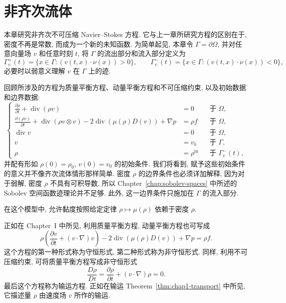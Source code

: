 \clearpage
\section{非齐次流体}
\label{chap:nonhomogeneous-fluids}
\renewcommand{\thestatement}{1.\arabic{statement}}
\renewcommand{\theHstatement}{ch06.sec01.\arabic{statement}}
\setcounter{statement}{0}
\renewcommand{\thechaptersixsectiononeremark}{1.\arabic{chaptersixsectiononeremark}}
\begin{sloppypar}

本章研究非齐次不可压缩 Navier--Stokes 方程. 它与上一章所研究方程的区别在于, 密度不再是常数, 而成为一个新的未知函数. 为简单起见, 本章令 $\Gamma=\partial\Omega$, 并对任意向量场 $v$ 和任意时刻 $t$, 将 $\Gamma$ 的流出部分和流入部分定义为
\[
 \Gamma_v^+(t)=\{x\in\Gamma:(v(t,x)\cdot\nu(x))>0\},
 \qquad
 \Gamma_v^-(t)=\{x\in\Gamma:(v(t,x)\cdot\nu(x))<0\},
\]
必要时以弱意义理解 $v$ 在 $\Gamma$ 上的迹.

回顾所涉及的方程为质量平衡方程、动量平衡方程和不可压缩约束, 以及初始数据和边界数据:
\[
\left\{
\begin{aligned}
 \frac{\partial\rho}{\partial t}+\operatorname{div}(\rho v)&=0&&\text{于 }\Omega,\\
 \frac{\partial(\rho v)}{\partial t}+\operatorname{div}(\rho v\otimes v)-2\operatorname{div}(\mu(\rho)D(v))+\nabla p&=\rho f&&\text{于 }\Omega,\\
 \operatorname{div}v&=0&&\text{于 }\Omega,\\
 v&=v_b&&\text{于 }\Gamma,\\
 \rho&=\rho^{\mathrm{in}}&&\text{于 }\Gamma_v^-(t),
\end{aligned}
\right.
\]
并配有形如 $\rho(0)=\rho_0$, $v(0)=v_0$ 的初始条件. 我们将看到, 赋予这些初始条件的意义并不像齐次流体情形那样简单. 密度 $\rho$ 的边界条件也必须详加解释, 因为对于弱解, 密度 $\rho$ 不具有可积导数, 所以 Chapter~\ref{chap:sobolev-spaces} 中所述的 Sobolev 空间函数迹理论并不足够. 此外, 这一边界条件只施加在 $\Gamma$ 的流入部分.

在这个模型中, 允许黏度按照给定定律 $\rho\mapsto\mu(\rho)$ 依赖于密度 $\rho$.

正如在 Chapter~I 中所见, 利用质量平衡方程, 动量平衡方程也可写成
\[
 \rho\left(\frac{\partial v}{\partial t}+(v\cdot\nabla)v\right)
 -2\operatorname{div}(\mu(\rho)D(v))+\nabla p=\rho f.
\]
这个方程的第一种形式称为守恒形式, 第二种形式称为非守恒形式. 同样, 利用不可压缩约束, 可将质量平衡方程写成非守恒形式
\begin{equation}
 \frac{D\rho}{Dt}=\frac{\partial\rho}{\partial t}+(v\cdot\nabla)\rho=0.
\label{eq:chap6-transport-equation}
\end{equation}
最后这个方程称为输运方程. 正如在输运 Theorem~\ref{thm:chap1-transport} 中所见, 它描述量 $\rho$ 由速度场 $v$ 所作的输运.


\end{sloppypar}
